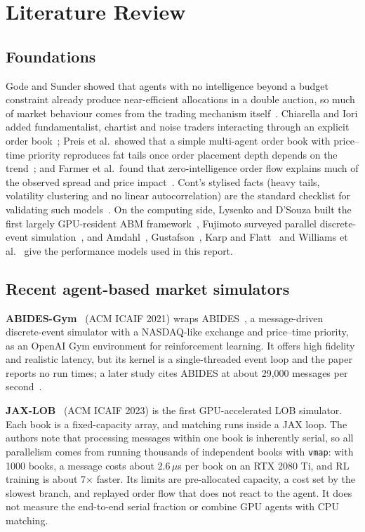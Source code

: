 \section{Literature Review}\label{sec:lit}

\subsection{Foundations}
Gode and Sunder showed that agents with no intelligence beyond a budget constraint already produce
near-efficient allocations in a double auction, so much of market behaviour comes from the trading
mechanism itself~\cite{gode1993}. Chiarella and Iori added fundamentalist, chartist and noise
traders interacting through an explicit order book~\cite{chiarella2002}; Preis et al.\ showed that a
simple multi-agent order book with price--time priority reproduces fat tails once order placement
depth depends on the trend~\cite{preis2006}; and Farmer et al.\ found that zero-intelligence order
flow explains much of the observed spread and price impact~\cite{farmer2005}. Cont's stylised facts
(heavy tails, volatility clustering and no linear autocorrelation) are the standard checklist for
validating such models~\cite{cont2001}. On the computing side, Lysenko and D'Souza built the first
largely GPU-resident ABM framework~\cite{lysenko2008}, Fujimoto surveyed parallel discrete-event
simulation~\cite{fujimoto1990}, and Amdahl~\cite{amdahl1967}, Gustafson~\cite{gustafson1988},
Karp and Flatt~\cite{karp1990} and Williams et al.~\cite{williams2009} give the performance models
used in this report.

\subsection{Recent agent-based market simulators}
\textbf{ABIDES-Gym}~\cite{amrouni2021} (ACM ICAIF 2021) wraps ABIDES~\cite{byrd2020abides}, a
message-driven discrete-event simulator with a NASDAQ-like exchange and price--time priority, as an
OpenAI Gym environment for reinforcement learning. It offers high fidelity and realistic latency,
but its kernel is a single-threaded event loop and the paper reports no run times; a later study
cites ABIDES at about 29{,}000 messages per second~\cite{mascioli2024}.

\textbf{JAX-LOB}~\cite{frey2023} (ACM ICAIF 2023) is the first GPU-accelerated LOB simulator. Each
book is a fixed-capacity array, and matching runs inside a JAX loop. The authors note that
processing messages within one book is inherently serial, so all parallelism comes from running
thousands of independent books with \texttt{vmap}: with 1000 books, a message costs about
2.6\,$\mu$s per book on an RTX 2080 Ti, and RL training is about 7$\times$ faster. Its limits are
pre-allocated capacity, a cost set by the slowest branch, and replayed order flow that does not
react to the agent. It does not measure the end-to-end serial fraction or combine GPU agents with
CPU matching.

